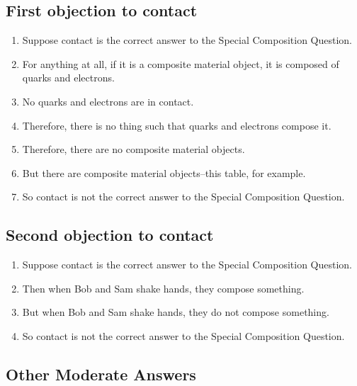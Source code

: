 \documentclass[oneside]{article}
\begin{document}


\subsection*{First objection to contact}
\begin{enumerate}
\item Suppose contact is the correct answer to the Special Composition Question.
\item For anything at all, if it is a composite material object, it is composed of quarks and electrons.
\item No quarks and electrons are in contact.
\item Therefore, there is no thing such that quarks and electrons compose it.
\item Therefore, there are no composite material objects.
\item But there are composite material objects--this table, for example.
\item So contact is not the correct answer to the Special Composition Question.
\end{enumerate}

\subsection*{Second objection to contact}
\begin{enumerate}
\item Suppose contact is the correct answer to the Special Composition Question.
\item Then when Bob and Sam shake hands, they compose something.
\item But when Bob and Sam shake hands, they do not compose something.
\item So contact is not the correct answer to the Special Composition Question.
\end{enumerate}

\subsection*{Other Moderate Answers}
\end{document}
